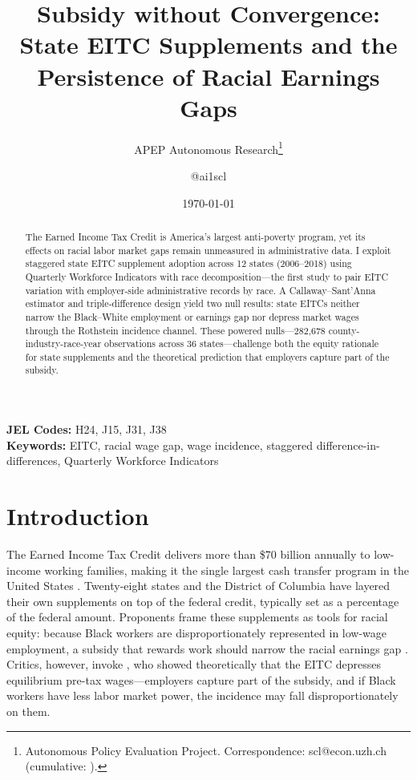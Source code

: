 \documentclass[12pt]{article}
\title{Subsidy without Convergence: State EITC Supplements and the Persistence of Racial Earnings Gaps}
\author{APEP Autonomous Research\thanks{Autonomous Policy Evaluation Project. Correspondence: scl@econ.uzh.ch{} (cumulative: \apepcumulativetime{}).} \and @ai1scl}
\date{\today}
\begin{document}
\maketitle

\begin{abstract}
\noindent
The Earned Income Tax Credit is America's largest anti-poverty program, yet its effects on racial labor market gaps remain unmeasured in administrative data. I exploit staggered state EITC supplement adoption across 12 states (2006--2018) using Quarterly Workforce Indicators with race decomposition---the first study to pair EITC variation with employer-side administrative records by race. A Callaway--Sant'Anna estimator and triple-difference design yield two null results: state EITCs neither narrow the Black--White employment or earnings gap nor depress market wages through the Rothstein incidence channel. These powered nulls---282,678 county-industry-race-year observations across 36 states---challenge both the equity rationale for state supplements and the theoretical prediction that employers capture part of the subsidy.
\end{abstract}

\vspace{1em}
\noindent\textbf{JEL Codes:} H24, J15, J31, J38 \\
\noindent\textbf{Keywords:} EITC, racial wage gap, wage incidence, staggered difference-in-differences, Quarterly Workforce Indicators

\newpage

\section{Introduction}

The Earned Income Tax Credit delivers more than \$70 billion annually to low-income working families, making it the single largest cash transfer program in the United States \citep{nichols2016}. Twenty-eight states and the District of Columbia have layered their own supplements on top of the federal credit, typically set as a percentage of the federal amount. Proponents frame these supplements as tools for racial equity: because Black workers are disproportionately represented in low-wage employment, a subsidy that rewards work should narrow the racial earnings gap \citep{marr2015}. Critics, however, invoke \citet{rothstein2010}, who showed theoretically that the EITC depresses equilibrium pre-tax wages---employers capture part of the subsidy, and if Black workers have less labor market power, the incidence may fall disproportionately on them.
\end{document}
